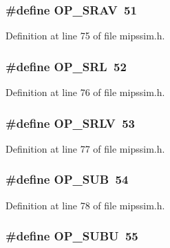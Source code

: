\subsubsection[{O\+P\+\_\+\+S\+R\+AV}]{\setlength{\rightskip}{0pt plus 5cm}\#define O\+P\+\_\+\+S\+R\+AV~51}\label{mipssim_8h_a090e1503ff891c6b299ba0029e073dae}


Definition at line 75 of file mipssim.\+h.

\subsubsection[{O\+P\+\_\+\+S\+RL}]{\setlength{\rightskip}{0pt plus 5cm}\#define O\+P\+\_\+\+S\+RL~52}\label{mipssim_8h_a536e03b9cc8fa87632a6c1079fe0cbe3}


Definition at line 76 of file mipssim.\+h.

\subsubsection[{O\+P\+\_\+\+S\+R\+LV}]{\setlength{\rightskip}{0pt plus 5cm}\#define O\+P\+\_\+\+S\+R\+LV~53}\label{mipssim_8h_a7fdea0bf519100fcc0626f76a904923a}


Definition at line 77 of file mipssim.\+h.

\subsubsection[{O\+P\+\_\+\+S\+UB}]{\setlength{\rightskip}{0pt plus 5cm}\#define O\+P\+\_\+\+S\+UB~54}\label{mipssim_8h_abe4a72f7e3f753e7059bc2f2a01a0cfc}


Definition at line 78 of file mipssim.\+h.

\subsubsection[{O\+P\+\_\+\+S\+U\+BU}]{\setlength{\rightskip}{0pt plus 5cm}\#define O\+P\+\_\+\+S\+U\+BU~55}\label{mipssim_8h_aca218b989a5cf7f9dec5c49e20e83441}


